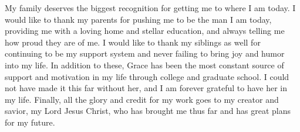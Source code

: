 {\begin{acknowledgments}
    My family deserves the biggest recognition for getting me to where I am today. I would like to
    thank my parents for pushing me to be the man I am today, providing me with a loving home and
    stellar education, and always telling me how proud they are of me. I would like to thank my
    siblings as well for continuing to be my support system and never failing to bring joy and
    humor into my life. In addition to these, Grace has been the most constant source of support
    and motivation in my life through college and graduate school. I could not have made it this
    far without her, and I am forever grateful to have her in my life. Finally, all the glory and
    credit for my work goes to my creator and savior, my Lord Jesus Christ, who has brought me thus
    far and has great plans for my future.
\end{acknowledgments}
}
